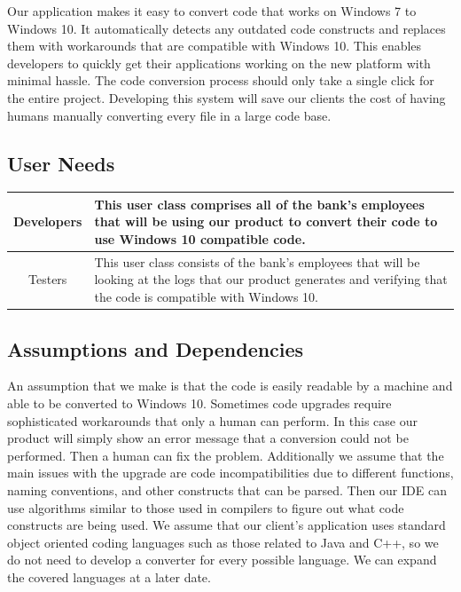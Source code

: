 \documentclass[12pt]{article}
\begin{document}
Our application makes it easy to convert code that works on Windows 7 to Windows 10. It automatically detects any outdated
code constructs and replaces them with workarounds that are compatible with Windows 10. This enables developers to quickly
get their applications working on the new platform with minimal hassle. The code conversion process should only take a
single click for the entire project. Developing this system will save our clients the cost of having humans
manually converting every file in a large code base.

\subsection{User Needs}

\begin{center}
    \begin{tabularx}{\linewidth}{|c|X|}
        \hline
        Developers & This user class comprises all of the bank's employees that will be using our product to convert their code to
        use Windows 10 compatible code.\\
        \hline
        Testers & This user class consists of the bank's employees that will be looking at the logs that our product generates and verifying
        that the code is compatible with Windows 10.\\
        \hline
    \end{tabularx}
\end{center}

\subsection{Assumptions and Dependencies}

An assumption that we make is that the code is easily readable by a machine and able to be converted to Windows 10. Sometimes
code upgrades require sophisticated workarounds that only a human can perform. In this case our product will simply show
an error message that a conversion could not be performed. Then a human can fix the problem. Additionally we assume that
the main issues with the upgrade are code incompatibilities due to different functions, naming conventions, and other constructs
that can be parsed. Then our IDE can use algorithms similar to those used in compilers to figure out what code constructs
are being used. We assume that our client's application uses standard object oriented coding languages such as those related to
Java and C++, so we do not need to develop a converter for every possible language. We can expand the covered languages at a later date.
\end{document}
